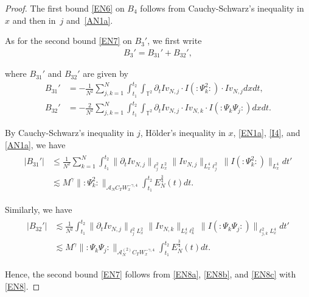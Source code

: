 \documentclass[letterpaper, 11pt,  reqno]{amsart}
\newcommand{\1}{\hspace{0.5mm}\text{I}\hspace{0.2mm}}
\newcommand{\noi}{\noindent}
\newcommand{\T}{\mathbb{T}}
\newcommand{\dt}{\partial_t}
\newcommand{\les}{\lesssim}
\newcommand{\g}{\gamma}
\newcommand{\A}{\mathcal{A}}
\newcommand{\EN}{E_N}
\newcommand{\wick}[1]{:\!{#1}\!:}
\renewcommand{\l}{\ell}
\numberwithin{equation}{section}
\numberwithin{theorem}{section}
\begin{document}
\begin{proof} 
The first bound \eqref{EN6} on $B_4$ follows 
from 
Cauchy-Schwarz's inequality
in $x$ and then in~$j$
and~\eqref{AN1a}.





As for the second bound \eqref{EN7} on $B_3'$, 
we first write 
\begin{align}
B_3' = B_{31}' + B_{32}',
\label{EN8a} 
\end{align}

\noi
where 
$B_{31}'$ and $B_{32}'$ are given by 
\begin{align*} 
B_{31}' & = 
- \frac{1}{N^2}\sum_{j, k =1}^N
 \int_{t_1}^{t_2} \int_{\T^2} \dt I v_{N,j} \cdot 
I ( \wick{ \Psi_k^2 }) \cdot I v_{N,j} d x d t,  \\
B_{32}' & = 
- \frac{2}{N^2}\sum_{j, k =1}^N
 \int_{t_1}^{t_2} \int_{\T^2} \dt I v_{N,j} 
\cdot 
 Iv_{N,k} \cdot I ( \wick{\Psi_k \Psi_j})  d x d t. 
\end{align*} 

\noi
By Cauchy-Schwarz's inequality in $j$, 
 H\"older's inequality in $x$, 
\eqref{EN1a}, 
\eqref{I4},
and \eqref{AN1a}, we have 
\begin{align}
\begin{split}
| B_{31}' | 
& \leq 
\frac 1{N^2} \sum_{k=1}^N 
\int_{t_1}^{t_2} 
\|  \dt I v_{N, j}\|_{\l_j^2L_x^2} 
\|  I v_{N, j} \|_{L_x^4\l^2_j} 
\| I ( \wick { \Psi_k^2} ) \|_{L_x^{4}}
d t' \\
& \les
M^{\g} 
 \|  \wick { \Psi_k^2}  \|_{\A_N C_T W_x^{-\g, 4}}
\int_{t_1}^{t_2}\EN^{\frac 34}(t)
d t .
\end{split}
\label{EN8b}
\end{align} 

\noi
Similarly, we have
\begin{align}
\begin{split}
| B_{32}' | 
& \les 
\frac 1{N^2}
\int_{t_1}^{t_2} 
\|  \dt I v_{N, j}\|_{\l_j^2L_x^2} 
\|  I v_{N, k} \|_{L_x^4\l^2_k} 
\| I ( \wick { \Psi_k \Psi_j} ) \|_{\l^2_{j, k} L_x^{4}}
d t' \\
& \les
M^{\g} 
 \|  \wick { \Psi_k \Psi_j }  \|_{\A_N^{(2)} C_T W_x^{-\g, 4}}
\int_{t_1}^{t_2}\EN^{\frac 34}(t)
d t.
\end{split}
\label{EN8c}
\end{align} 

\noi
Hence, the second bound \eqref{EN7}
follows from \eqref{EN8a}, \eqref{EN8b}, and \eqref{EN8c}
with \eqref{EN8}.
\end{proof}
\end{document}

